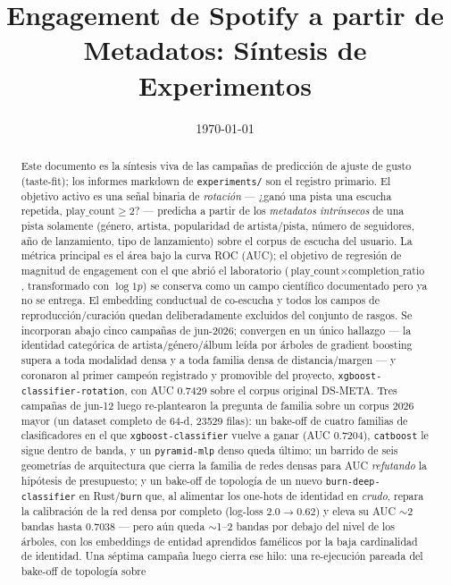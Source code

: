 \documentclass[11pt]{article}
\title{Engagement de Spotify a partir de Metadatos: Síntesis de Experimentos}
\author{}
\date{\today}
\begin{document}
\maketitle

\begin{abstract}
Este documento es la síntesis viva de las campañas de predicción de ajuste de
gusto (taste-fit); los informes markdown de \texttt{experiments/} son el
registro primario. El objetivo activo es una señal binaria de \emph{rotación}
--- ¿ganó una pista una escucha repetida, $\text{play\_count}\ge 2$? ---
predicha a partir de los \emph{metadatos intrínsecos} de una pista solamente
(género, artista, popularidad de artista/pista, número de seguidores, año de
lanzamiento, tipo de lanzamiento) sobre el corpus de escucha del usuario. La
métrica principal es el área bajo la curva ROC (AUC); el objetivo de regresión
de magnitud de engagement con el que abrió el laboratorio
($\text{play\_count}\times \text{completion\_ratio}$, transformado con
$\log1p$) se conserva como un campo científico documentado pero ya no se
entrega. El embedding conductual de co-escucha y todos los campos de
reproducción/curación quedan deliberadamente excluidos del conjunto de rasgos.
Se incorporan abajo cinco campañas de jun-2026; convergen en un único hallazgo
--- la identidad categórica de artista/género/álbum leída por árboles de
gradient boosting supera a toda modalidad densa y a toda familia densa de
distancia/margen --- y coronaron al primer campeón registrado y promovible del
proyecto, \texttt{xgboost-classifier-rotation}, con AUC \num{0.7429} sobre el
corpus original DS-META. Tres campañas de jun-12 luego re-plantearon la pregunta
de familia sobre un corpus 2026 mayor (un dataset completo de 64-d,
\num{23529} filas): un bake-off de cuatro familias de clasificadores en el que
\texttt{xgboost-classifier} vuelve a ganar (AUC \num{0.7204}),
\texttt{catboost} le sigue dentro de banda, y un \texttt{pyramid-mlp} denso
queda último; un barrido de seis geometrías de arquitectura que cierra la
familia de redes densas para AUC \emph{refutando} la hipótesis de presupuesto;
y un bake-off de topología de un nuevo \texttt{burn-deep-classifier} en
Rust/\texttt{burn} que, al alimentar los one-hots de identidad en \emph{crudo},
repara la calibración de la red densa por completo (log-loss $2.0\to 0.62$) y
eleva su AUC $\sim$2 bandas hasta \num{0.7038} --- pero aún queda $\sim$1--2
bandas por debajo del nivel de los árboles, con los embeddings de entidad
aprendidos famélicos por la baja cardinalidad de identidad. Una séptima campaña
luego cierra ese hilo: una re-ejecución pareada del bake-off de topología sobre

\end{abstract}
\end{document}
